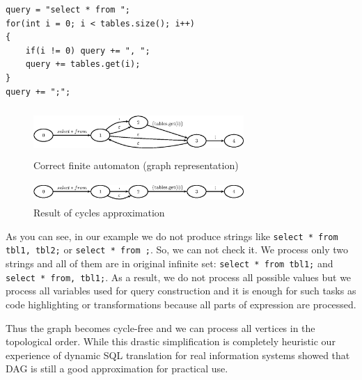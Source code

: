 \begin{verbatim} 
query = "select * from ";
for(int i = 0; i < tables.size(); i++)
{
    if(i != 0) query += ", ";
    query += tables.get(i);
}
query += ";";
\end{verbatim}

\begin{figure}[t]
    \begin{center}
        \includegraphics[width=8cm,height=1.8cm]{graphs/cyclesOrig.eps}
        \caption{Correct finite automaton (graph representation)}
        \label{cyclesOrig}        
    \end{center}
\end{figure}



\begin{figure}[t]
    \begin{center}
        \includegraphics[width=8cm,height=0.8cm]{graphs/cyclesApproximation.eps}
        \caption{Result of cycles approximation}
        \label{cyclesApproximation}        
    \end{center}
\end{figure}


As you can see, in our example we do not produce strings like \verb|select * from tbl1, tbl2;| or \verb|select * from ;|. So, we can not check it. We process only two strings and all of them are in original infinite set: \verb|select * from tbl1;| and \verb|select * from, tbl1;|. As a result, we do not process all possible values but we process all variables used for query construction and it is enough for such tasks as code highlighting or transformations because all parts of expression are processed. 

Thus the graph becomes cycle-free and we can process all vertices in the topological order. While this drastic simplification is completely heuristic our experience of dynamic SQL translation for real information systems showed that DAG is still a good approximation for practical use.


